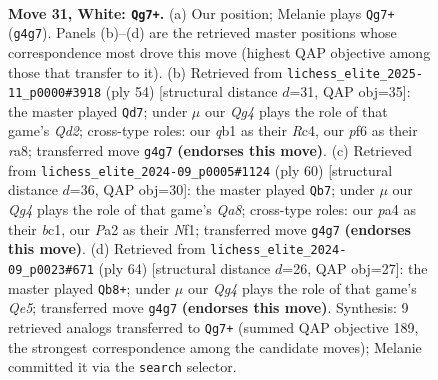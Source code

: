 \documentclass[11pt]{article}
\begin{document}
\clearpage

\begin{figure}[p]\centering
\begin{subfigure}{0.46\textwidth}\centering
\resizebox{\linewidth}{!}{%
\newchessgame
\chessboard[
  setfen={r7/2p1k2p/3p1p2/8/pP4Q1/6P1/P4PKP/1q6 w - - 0 31},
  showmover=false,
  pgfstyle=straightmove, color=movearrow, markmove={g4-g7}
]}
\caption{}
\end{subfigure}\hfill
\begin{subfigure}{0.46\textwidth}\centering
\resizebox{\linewidth}{!}{%
\newchessgame
\chessboard[
  setfen={r5k1/4pp2/6pp/2p1q3/2R5/4P1P1/3Q1PKP/8 w - - 6 28},
  showmover=false,
  pgfstyle=straightmove, color=movearrow, markmove={d2-d7}
]}
\caption{}
\end{subfigure}
\\[4pt]
\begin{subfigure}{0.46\textwidth}\centering
\resizebox{\linewidth}{!}{%
\newchessgame
\chessboard[
  setfen={Q7/5ppk/7p/4p3/2q1P3/6P1/5P1P/2b2NK1 w - - 1 31},
  showmover=false,
  pgfstyle=straightmove, color=movearrow, markmove={a8-b7}
]}
\caption{}
\end{subfigure}\hfill
\begin{subfigure}{0.46\textwidth}\centering
\resizebox{\linewidth}{!}{%
\newchessgame
\chessboard[
  setfen={6k1/5p1p/6p1/pP2Q3/q7/6P1/5PKP/8 w - - 2 33},
  showmover=false,
  pgfstyle=straightmove, color=movearrow, markmove={e5-b8}
]}
\caption{}
\end{subfigure}
\caption{\textbf{Move 31, White: \texttt{Qg7+}.} (a) Our position; Melanie plays \texttt{Qg7+} (\texttt{g4g7}). Panels (b)--(d) are the retrieved master positions whose correspondence most drove this move (highest QAP objective among those that transfer to it). (b) Retrieved from \texttt{lichess\_elite\_2025-11\_p0000\#3918} (ply 54) [structural distance $d$=31, QAP obj=35]: the master played \texttt{Qd7}; under $\mu$ our \emph{Qg4} plays the role of that game's \emph{Qd2}; cross-type roles: our \emph{q}b1 as their \emph{R}c4, our \emph{p}f6 as their \emph{r}a8; transferred move \texttt{g4g7} \textbf{(endorses this move)}. (c) Retrieved from \texttt{lichess\_elite\_2024-09\_p0005\#1124} (ply 60) [structural distance $d$=36, QAP obj=30]: the master played \texttt{Qb7}; under $\mu$ our \emph{Qg4} plays the role of that game's \emph{Qa8}; cross-type roles: our \emph{p}a4 as their \emph{b}c1, our \emph{P}a2 as their \emph{N}f1; transferred move \texttt{g4g7} \textbf{(endorses this move)}. (d) Retrieved from \texttt{lichess\_elite\_2024-09\_p0023\#671} (ply 64) [structural distance $d$=26, QAP obj=27]: the master played \texttt{Qb8+}; under $\mu$ our \emph{Qg4} plays the role of that game's \emph{Qe5}; transferred move \texttt{g4g7} \textbf{(endorses this move)}. Synthesis: 9 retrieved analogs transferred to \texttt{Qg7+} (summed QAP objective 189, the strongest correspondence among the candidate moves); Melanie committed it via the \texttt{search} selector.}
\label{fig:thought-m60}
\end{figure}
\end{document}
